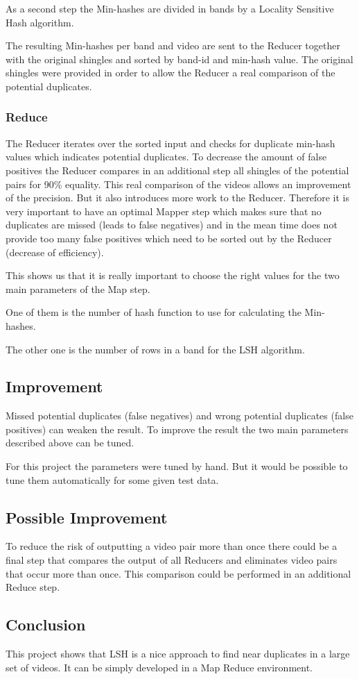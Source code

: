 \documentclass[a4paper, 11pt]{article}
\begin{document}
As a second step the Min-hashes are divided in bands by a Locality Sensitive Hash algorithm.

The resulting Min-hashes per band and video are sent to the Reducer together with the original shingles and sorted by band-id and min-hash value. The original shingles were provided in order to allow the Reducer a real comparison of the potential duplicates.

\subsubsection{Reduce}

The Reducer iterates over the sorted input and checks for duplicate min-hash values which indicates potential duplicates. To decrease the amount of false positives the Reducer compares in an additional step all shingles of the potential pairs for 90\% equality. This real comparison of the videos allows an improvement of the precision. But it also introduces more work to the Reducer. 
Therefore it is very important to have an optimal Mapper step which makes sure that no duplicates are missed (leads to false negatives) and in the mean time does not provide too many false positives which need to be sorted out by the Reducer (decrease of efficiency).

This shows us that it is really important to choose the right values for the two main parameters of the Map step.

One of them is the number of hash function to use for calculating the Min-hashes.

The other one is the number of rows in a band for the LSH algorithm.


\subsection{Improvement}

Missed potential duplicates
(false negatives) and wrong potential duplicates (false positives) can weaken the result. To improve the result the two main parameters described above can be tuned.

For this project the parameters were tuned by hand. But it would be possible to 
tune them automatically for some given test data.


\subsection{Possible Improvement}

To reduce the risk of outputting a video pair more than once there could be a final
step that compares the output of all Reducers and eliminates video pairs that occur more than once. This comparison could be performed in an additional Reduce step.

\subsection{Conclusion}

This project shows that LSH is a nice approach to find near duplicates in a large set
of videos. It can be simply developed in a Map Reduce environment.
\end{document}
